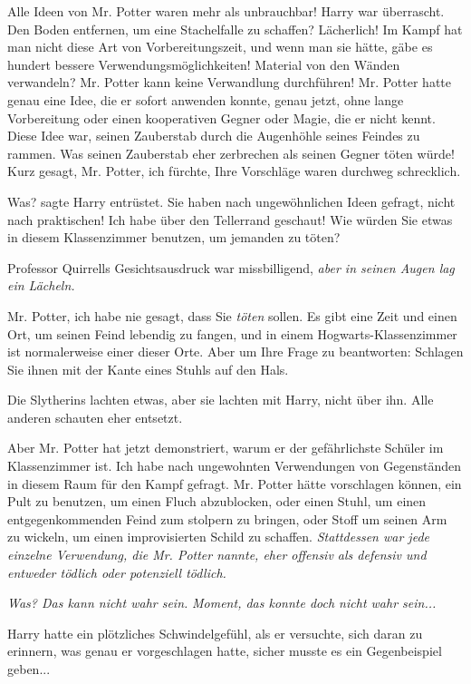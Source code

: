 \glqq Alle Ideen von Mr. Potter waren mehr als unbrauchbar!\grqq{} Harry war
überrascht. \glqq Den Boden entfernen, um eine Stachelfalle zu schaffen?
Lächerlich! Im Kampf hat man nicht diese Art von Vorbereitungszeit, und wenn man
sie hätte, gäbe es hundert bessere Verwendungsmöglichkeiten! Material von den
Wänden verwandeln? Mr. Potter kann keine Verwandlung durchführen! Mr. Potter
hatte genau eine Idee, die er sofort anwenden konnte, genau jetzt, ohne lange
Vorbereitung oder einen kooperativen Gegner oder Magie, die er nicht kennt.
Diese Idee war, seinen Zauberstab durch die Augenhöhle seines Feindes zu rammen.
Was seinen Zauberstab eher zerbrechen als seinen Gegner töten würde! Kurz
gesagt, Mr. Potter, ich fürchte, Ihre Vorschläge waren durchweg
schrecklich.\grqq{}

\glqq Was?\grqq{} sagte Harry entrüstet. \glqq Sie haben nach ungewöhnlichen
Ideen gefragt, nicht nach praktischen! Ich habe über den Tellerrand geschaut!
Wie würden Sie etwas in diesem Klassenzimmer benutzen, um jemanden zu
töten?\grqq{}

Professor Quirrells Gesichtsausdruck war missbilligend, \emph{aber in seinen
Augen lag ein Lächeln.}

\glqq Mr. Potter, ich habe nie gesagt, dass Sie \emph{töten} sollen. Es gibt
eine Zeit und einen Ort, um seinen Feind lebendig zu fangen, und in einem
Hogwarts-Klassenzimmer ist normalerweise einer dieser Orte. Aber um Ihre Frage
zu beantworten: Schlagen Sie ihnen mit der Kante eines Stuhls auf den
Hals.\grqq{}

Die Slytherins lachten etwas, aber sie lachten mit Harry, nicht über ihn. Alle
anderen schauten eher entsetzt.

\glqq Aber Mr. Potter hat jetzt demonstriert, warum er der gefährlichste Schüler
im Klassenzimmer ist. Ich habe nach ungewohnten Verwendungen von Gegenständen in
diesem Raum für den Kampf gefragt. Mr. Potter hätte vorschlagen können, ein Pult
zu benutzen, um einen Fluch abzublocken, oder einen Stuhl, um einen
entgegenkommenden Feind zum stolpern zu bringen, oder Stoff um seinen Arm zu
wickeln, um einen improvisierten Schild zu schaffen. \emph{Stattdessen war jede
einzelne Verwendung, die Mr. Potter nannte, eher offensiv als defensiv und
entweder tödlich oder potenziell tödlich.}\grqq{}

\emph{Was? Das kann nicht wahr sein. }\emph{Moment, das konnte doch nicht wahr
sein...}

Harry hatte ein plötzliches Schwindelgefühl, als er versuchte, sich daran zu
erinnern, was genau er vorgeschlagen hatte, sicher musste es ein Gegenbeispiel
geben...

